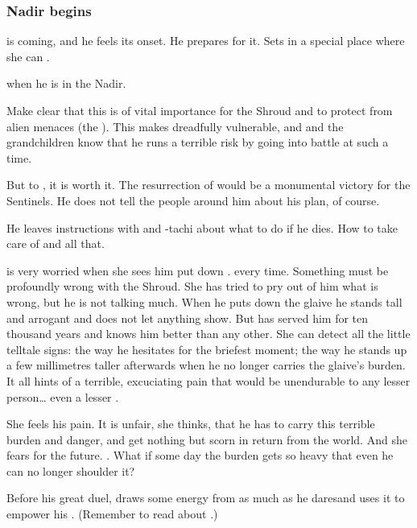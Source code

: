 \subsubsection{Nadir begins}
 is coming, and he feels its onset. 
He prepares for it. 
Sets \Rystessakhin{} in a special place where she can . 

\Ishnaruchaefir {} when he is in the Nadir. 

Make clear that this is of vital importance for the Shroud and to protect \Miith{} from alien menaces (the \banes). 
This makes \Ishnaruchaefir{} dreadfully vulnerable, and \Criseis{} and the grandchildren know that he runs a terrible risk by going into battle at such a time. 

But to \Ishnaruchaefir, it is worth it. 
The resurrection of \Nithdornazsh{} would be a monumental victory for the Sentinels. 
He does not tell the people around him about his plan, of course. 

He leaves instructions with \Criseis{} and \Thiencaste-tachi about what to do if he dies. 
How to take care of \Rystessakhin{} and all that. 

\Criseis{} is very worried when she sees him put down \Rystessakhin. 
 every time. 
Something must be profoundly wrong with the Shroud. 
She has tried to pry out of him what is wrong, but he is not talking much. 
When he puts down the glaive he stands tall and arrogant and does not let anything show. 
But \Criseis{} has served him for ten thousand years and knows him better than any other. 
She can detect all the little telltale signs: 
the way he hesitates for the briefest moment; the way he stands up a few millimetres taller afterwards when he no longer carries the glaive's burden. 
It all hints of a terrible, excuciating pain that would be unendurable to any lesser person\ldots{} even a lesser \dragon. 

She feels his pain. 
It is unfair, she thinks, that he has to carry this terrible burden and danger, and get nothing but scorn in return from the world. 
And she fears for the future. 
. 
What if some day the burden gets so heavy that even he can no longer shoulder it? 

Before his great duel, \Ishnaruchaefir{} draws some energy from \Rystessakhin \dash as much as he dares\dash and uses it to empower his . 
(Remember to read about .)

